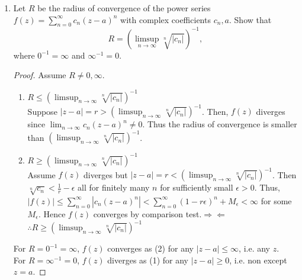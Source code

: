 \documentclass{article}
\begin{document}
\begin{enumerate}[font = \Large\bfseries\itshape\space, leftmargin = 3mm, labelsep = 3mm]
\item
Let $R$ be the radius of convergence of the power series $f(z) = \sum_{n=0}^\infty c_n(z-a)^n$ with complex coefficients $c_n, a$.
Show that
$$
R = \left(\limsup_{n\rightarrow\infty} \sqrt[n]{|c_n|}\right)^{-1},
$$
where $0^{-1} =\infty$ and $\infty^{-1} = 0$.

\begin{proof}
Assume $R \neq 0, \infty$.

\begin{enumerate}[leftmargin = -\parindent]
\item $R \leq \left(\limsup_{n\rightarrow\infty}\sqrt[n]{|c_n|}\right)^{-1}$\\
Suppose $|z-a| = r > \left(\limsup_{n\rightarrow\infty} \sqrt[n]{|c_n|}\right)^{-1}$.
Then, $f(z)$ diverges since $\lim_{n\rightarrow\infty} c_n(z-a)^n \neq 0$.
Thus the radius of convergence is smaller than $\left(\limsup_{n\rightarrow\infty} \sqrt[n]{|c_n|}\right)^{-1}$.

\item $R \geq \left(\limsup_{n\rightarrow\infty}\sqrt[n]{|c_n|}\right)^{-1}$\\
Assume $f(z)$ diverges but $|z-a| = r < \left(\limsup_{n\rightarrow\infty}\sqrt[n]{|c_n|}\right)^{-1}$.
Then $\sqrt[n]{c_n} < \frac{1}{r} - \epsilon$ all for finitely many $n$ for sufficiently small $\epsilon > 0$.
Thus, $|f(z)| \leq \sum_{n=0}^\infty |c_n(z-a)^n| < \sum_{n=0}^\infty (1-r\epsilon)^n + M_\epsilon < \infty$ for some $M_\epsilon$.
Hence $f(z)$ converges by comparison test.$\Rightarrow\!\Leftarrow$
$\therefore R \geq \left(\limsup_{n\rightarrow\infty}\sqrt[n]{|c_n|}\right)^{-1}$
\end{enumerate}

For $R = 0^{-1} = \infty$, $f(z)$ converges as (2) for any $|z-a| \leq \infty$, i.e. any $z$.\\
For $R = \infty^{-1} = 0$, $f(z)$ diverges as (1) for any $|z-a| \geq 0$, i.e. non except $z=a$.

\end{proof}


\end{enumerate}
\end{document}

